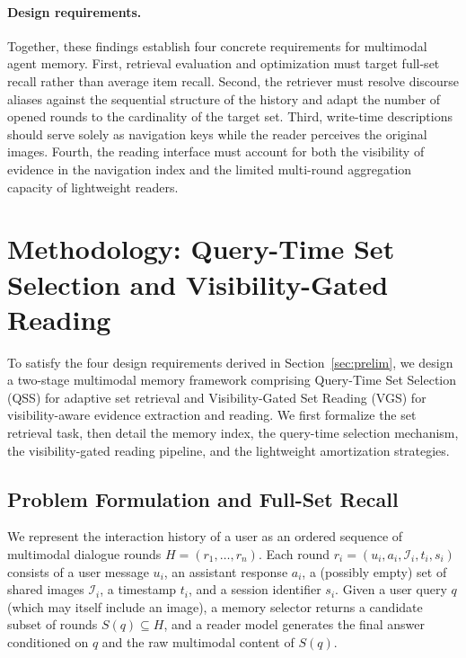 \documentclass[10pt]{article}
\newcommand{\qss}{QSS}
\begin{document}
\paragraph{Design requirements.} Together, these findings establish four concrete requirements for multimodal agent memory. First, retrieval evaluation and optimization must target full-set recall rather than average item recall. Second, the retriever must resolve discourse aliases against the sequential structure of the history and adapt the number of opened rounds to the cardinality of the target set. Third, write-time descriptions should serve solely as navigation keys while the reader perceives the original images. Fourth, the reading interface must account for both the visibility of evidence in the navigation index and the limited multi-round aggregation capacity of lightweight readers.

\section{Methodology: Query-Time Set Selection and Visibility-Gated Reading}
\label{sec:method}

To satisfy the four design requirements derived in Section~\ref{sec:prelim}, we design a two-stage multimodal memory framework comprising Query-Time Set Selection (\qss{}) for adaptive set retrieval and Visibility-Gated Set Reading (VGS) for visibility-aware evidence extraction and reading. We first formalize the set retrieval task, then detail the memory index, the query-time selection mechanism, the visibility-gated reading pipeline, and the lightweight amortization strategies.

\subsection{Problem Formulation and Full-Set Recall}
\label{sec:formulation}

We represent the interaction history of a user as an ordered sequence of multimodal dialogue rounds $H = (r_1, \dots, r_n)$. Each round $r_i = (u_i, a_i, \mathcal{I}_i, t_i, s_i)$ consists of a user message $u_i$, an assistant response $a_i$, a (possibly empty) set of shared images $\mathcal{I}_i$, a timestamp $t_i$, and a session identifier $s_i$. Given a user query $q$ (which may itself include an image), a memory selector returns a candidate subset of rounds $S(q) \subseteq H$, and a reader model generates the final answer conditioned on $q$ and the raw multimodal content of $S(q)$.
\end{document}
